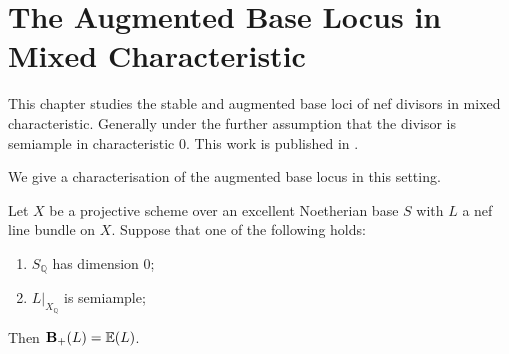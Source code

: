%
%
%
%
%
%
%
%
%
%

\chapter{The Augmented Base Locus in Mixed Characteristic}

This chapter studies the stable and augmented base loci of nef divisors in mixed characteristic. Generally under the further assumption that the divisor is semiample in characteristic $0$. This work is published in \cite{stigant2021augmented}.

We give a characterisation of the augmented base locus in this setting.

\begin{theorem}
Let $X$ be a projective scheme over an excellent Noetherian base $S$ with $L$ a nef line bundle on $X$. 
Suppose that one of the following holds:
\begin{enumerate}
	\item $S_{\mathbb{Q}}$ has dimension $0$;
	\item $L|_{X_{\mathbb{Q}}}$ is semiample;
\end{enumerate}

Then $\mathbf{B}_{+}(L)=\mathbb{E}(L)$.
\end{theorem}

